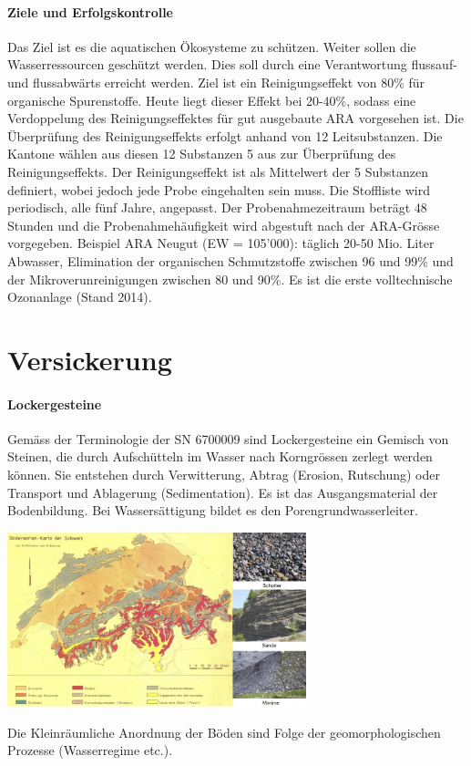 \documentclass[9pt, openright=false]{scrartcl}
\begin{document}
\paragraph{Ziele und Erfolgskontrolle} Das Ziel ist es die aquatischen Ökosysteme zu schützen. Weiter sollen die Wasserressourcen geschützt werden. Dies soll durch eine Verantwortung flussauf- und flussabwärts erreicht werden. Ziel ist ein Reinigungseffekt von 80\% für organische Spurenstoffe. Heute liegt dieser Effekt bei 20-40\%, sodass eine Verdoppelung des Reinigungseffektes für gut ausgebaute ARA vorgesehen ist. Die Überprüfung des Reinigungseffekts erfolgt anhand von 12 Leitsubstanzen. Die Kantone wählen aus diesen 12 Substanzen 5 aus zur Überprüfung des Reinigungseffekts. Der Reinigungseffekt ist als Mittelwert der 5 Substanzen definiert, wobei jedoch jede Probe eingehalten sein muss. Die Stoffliste wird periodisch, alle fünf Jahre, angepasst. Der Probenahmezeitraum beträgt 48 Stunden und die Probenahmehäufigkeit wird abgestuft nach der ARA-Grösse vorgegeben. Beispiel ARA Neugut (EW = 105'000): täglich 20-50 Mio. Liter Abwasser, Elimination der organischen Schmutzstoffe zwischen 96 und 99\% und der Mikroverunreinigungen zwischen 80 und 90\%. Es ist die erste volltechnische Ozonanlage (Stand 2014).
\section{Versickerung} 
\paragraph{Lockergesteine} Gemäss der Terminologie der SN 6700009 sind Lockergesteine ein Gemisch von Steinen, die durch Aufschütteln im Wasser nach Korngrössen zerlegt werden können. Sie entstehen durch Verwitterung, Abtrag (Erosion, Rutschung) oder Transport und Ablagerung (Sedimentation). Es ist das Ausgangsmaterial der Bodenbildung. Bei Wassersättigung bildet es den Porengrundwasserleiter. 
\begin{center}
\includegraphics[width=0.65\textwidth]{images/geologisch}
\end{center}
Die Kleinräumliche Anordnung der Böden sind Folge der geomorphologischen Prozesse (Wasserregime etc.). 
\end{document}
